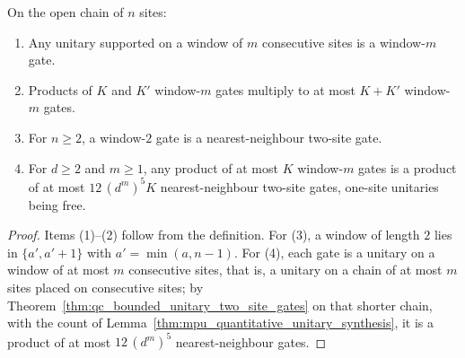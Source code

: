\begin{lemma}
    \label{lem:qc_window_products}
    \leanok
    On the open chain of $n$ sites:
    \begin{enumerate}
        \item Any unitary supported on a window of $m$ consecutive sites is a window-$m$ gate.
        \item Products of $K$ and $K'$ window-$m$ gates multiply to at most $K+K'$ window-$m$ gates.
        \item For $n\ge2$, a window-$2$ gate is a nearest-neighbour two-site gate.
        \item For $d\ge2$ and $m\ge1$, any product of at most $K$ window-$m$ gates is a product of at most $12\,(d^m)^5K$ nearest-neighbour two-site gates, one-site unitaries being free.
    \end{enumerate}
\end{lemma}
\begin{proof}
    \leanok
    Items (1)--(2) follow from the definition. For (3), a window of length $2$ lies in $\{a',a'+1\}$ with $a'=\min(a,n-1)$. For (4), each gate is a unitary on a window of at most $m$ consecutive sites, that is, a unitary on a chain of at most $m$ sites placed on consecutive sites; by Theorem~\ref{thm:qc_bounded_unitary_two_site_gates} on that shorter chain, with the count of Lemma~\ref{thm:mpu_quantitative_unitary_synthesis}, it is a product of at most $12\,(d^m)^5$ nearest-neighbour gates.
\end{proof}
